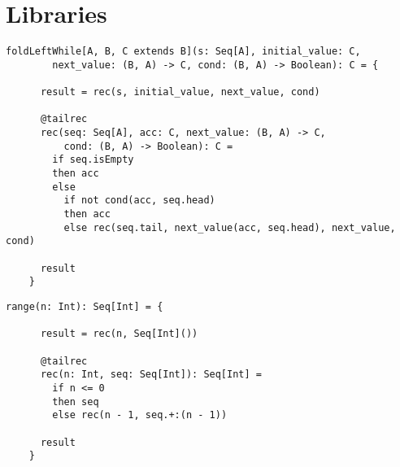 \chapter{Libraries}

\begin{lstlisting}[label={lst:foldLeftWhile}]
    foldLeftWhile[A, B, C extends B](s: Seq[A], initial_value: C,
        next_value: (B, A) -> C, cond: (B, A) -> Boolean): C = {

      result = rec(s, initial_value, next_value, cond)

      @tailrec
      rec(seq: Seq[A], acc: C, next_value: (B, A) -> C,
          cond: (B, A) -> Boolean): C =
        if seq.isEmpty
        then acc
        else
          if not cond(acc, seq.head)
          then acc
          else rec(seq.tail, next_value(acc, seq.head), next_value, cond)

      result
    }
\end{lstlisting}

\begin{lstlisting}[label={lst:range}]
    range(n: Int): Seq[Int] = {

      result = rec(n, Seq[Int]())

      @tailrec
      rec(n: Int, seq: Seq[Int]): Seq[Int] =
        if n <= 0
        then seq
        else rec(n - 1, seq.+:(n - 1))

      result
    }
\end{lstlisting}


